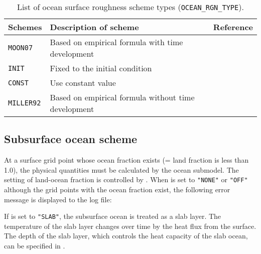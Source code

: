 \begin{table}[h]
\begin{center}
  \caption{List of ocean surface roughness scheme types (\texttt{OCEAN\_RGN\_TYPE}).}
  \label{tab:nml_ocean_rgn}
  \begin{tabularx}{150mm}{llX} \hline
    \rowcolor[gray]{0.9}  Schemes & Description of scheme & Reference \\ \hline
      \verb|MOON07|   & Based on empirical formula with time development    & \citet{moon_2007} \\
      \verb|INIT|     & Fixed to the initial condition \\
      \verb|CONST|    & Use constant value \\
      \verb|MILLER92| & Based on empirical formula without time development & \citet{miller_1992} \\
    \hline
  \end{tabularx}
\end{center}
\end{table}


\clearpage
\subsection{Subsurface ocean scheme}

At a surface grid point whose ocean fraction exists (= land fraction is less than 1.0),
the physical quantities must be calculated by the ocean submodel.
The setting of land-ocean fraction is controlled by .
When  is set to \verb|"NONE"| or \verb|"OFF"| although the grid points with the ocean fraction exist, the following error message is displayed to the log file:


If  is set to \verb|"SLAB"|, the subsurface ocean is treated as a slab layer. The temperature of the slab layer changes over time by the heat flux from the surface. The depth of the slab layer, which controls the heat capacity of the slab ocean, can be specified  in .


